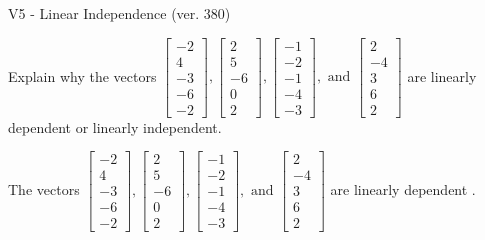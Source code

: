 \begin{exercise}
  \begin{exerciseTitle}V5 - Linear Independence (ver. 380)\end{exerciseTitle}
  \begin{exerciseStatement}
    Explain why the vectors \(\left[\begin{array}{r}
-2 \\
4 \\
-3 \\
-6 \\
-2
\end{array}\right] , \left[\begin{array}{r}
2 \\
5 \\
-6 \\
0 \\
2
\end{array}\right] , \left[\begin{array}{r}
-1 \\
-2 \\
-1 \\
-4 \\
-3
\end{array}\right] , \text{ and } \left[\begin{array}{r}
2 \\
-4 \\
3 \\
6 \\
2
\end{array}\right]\) are linearly dependent or linearly independent.	


  \end{exerciseStatement}
  \begin{exerciseAnswer}
   The vectors \(\left[\begin{array}{r}
-2 \\
4 \\
-3 \\
-6 \\
-2
\end{array}\right] , \left[\begin{array}{r}
2 \\
5 \\
-6 \\
0 \\
2
\end{array}\right] , \left[\begin{array}{r}
-1 \\
-2 \\
-1 \\
-4 \\
-3
\end{array}\right] , \text{ and } \left[\begin{array}{r}
2 \\
-4 \\
3 \\
6 \\
2
\end{array}\right]\) are 
  	 linearly dependent  .
  


  \end{exerciseAnswer}
\end{exercise}